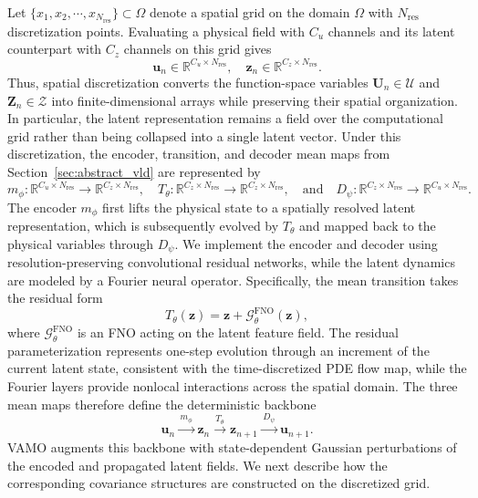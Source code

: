 \documentclass[11pt]{article}
\begin{document}
Let $\{x_1,x_2,\cdots,x_{N_\mathrm{res}}\}\subset\Omega$ denote a spatial grid on the domain $\Omega$ with $N_{\mathrm{res}}$ discretization points. Evaluating a physical field with $C_u$ channels and its latent counterpart with $C_z$ channels on this grid gives
\[ 
\mathbf u_n \in \mathbb R^{C_u\times N_{\mathrm{res}}}, \quad
\mathbf z_n \in \mathbb R^{C_z\times N_{\mathrm{res}}}. 
\] 
Thus, spatial discretization converts the function-space variables $\mathbf U_n\in\mathcal U$ and $\mathbf Z_n\in\mathcal Z$ into finite-dimensional arrays while preserving their spatial organization. In particular, the latent representation remains a field over the computational grid rather than being collapsed into a single latent vector. Under this discretization, the encoder, transition, and decoder mean maps from Section~\ref{sec:abstract_vld} are represented by 
\[ 
m_\phi: \mathbb R^{C_u\times N_{\mathrm{res}}} \rightarrow \mathbb R^{C_z\times N_{\mathrm{res}}}, \quad 
T_\theta: \mathbb R^{C_z\times N_{\mathrm{res}}} \rightarrow \mathbb R^{C_z\times N_{\mathrm{res}}},\quad\text{and}\quad
D_\psi: \mathbb R^{C_z\times N_{\mathrm{res}}} \rightarrow \mathbb R^{C_u\times N_{\mathrm{res}}}. 
\] 
The encoder $m_\phi$ first lifts the physical state to a spatially resolved latent representation, which is subsequently evolved by $T_\theta$ and mapped back to the physical variables through $D_\psi$. We implement the encoder and decoder using resolution-preserving convolutional residual networks, while the latent dynamics are modeled by a Fourier neural operator. Specifically, the mean transition takes the residual form 
\begin{equation} 
T_\theta(\mathbf z) = \mathbf z + \mathcal G_\theta^{\mathrm{FNO}}(\mathbf z), \label{eq:vamo_residual_transition} 
\end{equation} 
where $\mathcal G_\theta^{\mathrm{FNO}}$ is an FNO acting on the latent feature field. The residual parameterization represents one-step evolution through an increment of the current latent state, consistent with the time-discretized PDE flow map, while the Fourier layers provide nonlocal interactions across the spatial domain. The three mean maps therefore define the deterministic backbone 
\[ 
\mathbf u_n \xrightarrow{\,m_\phi\,} \mathbf z_n \xrightarrow{\,T_\theta\,} \mathbf z_{n+1} \xrightarrow{\,D_\psi\,} \mathbf u_{n+1}. 
\] 
VAMO augments this backbone with state-dependent Gaussian perturbations of the encoded and propagated latent fields. We next describe how the corresponding covariance structures are constructed on the discretized grid.
\end{document}
